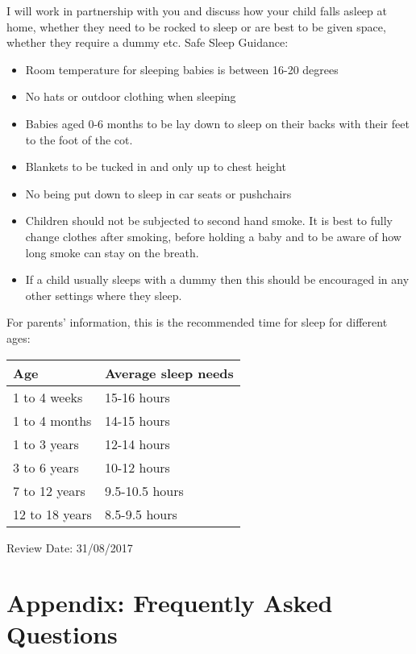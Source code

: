 I will work in partnership with you and discuss how your child falls asleep at home, whether they need to be rocked to sleep or are best to be given space, whether they require a dummy etc. 
Safe Sleep Guidance:

\begin{itemize}
\item Room temperature for sleeping babies is between 16-20 degrees
\item No hats or outdoor clothing when sleeping
\item Babies aged 0-6 months to be lay down to sleep on their backs with their feet to the foot of the cot.
\item Blankets to be tucked in and only up to chest height
\item No being put down to sleep in car seats or pushchairs
\item Children should not be subjected to second hand smoke. It is best to fully change clothes after smoking, before holding a baby and to be aware of how long smoke can stay on the breath. 
\item If a child usually sleeps with a dummy then this should be encouraged in any other settings where they sleep. 
\end{itemize}

For parents' information, this is the recommended time for sleep for different ages:

\begin{table}[h]
  \begin{tabular}{|l|l|}
    \hline
    Age & Average sleep needs \\
    \hline
    1 to 4 weeks     &   15-16 hours \\
    \hline       
    1 to 4 months &   14-15 hours \\
    \hline
    1 to 3 years &   12-14 hours \\
    \hline
    3 to 6 years &   10-12 hours \\
    \hline
    7 to 12 years &   9.5-10.5 hours \\
    \hline
    12 to 18 years &   8.5-9.5 hours \\
    \hline
  \end{tabular}
\end{table}

Review Date: 31/08/2017

\clearpage

\appendix
\section{Appendix: Frequently Asked Questions}

